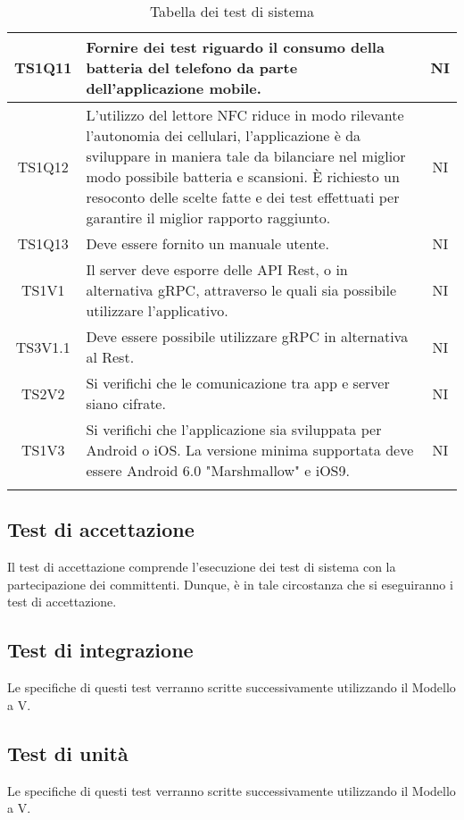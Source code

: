 \begin{center}
\begin{longtable}{|c|p{10cm}|c|}
			\hline
			TS1Q11 & Fornire dei test riguardo il consumo della batteria del telefono da parte dell'applicazione mobile. & NI \\	
			\hline
			TS1Q12 & L’utilizzo del lettore NFC riduce in modo rilevante l’autonomia dei cellulari, l’applicazione è da sviluppare in maniera tale da bilanciare nel miglior modo possibile batteria e scansioni. È richiesto un resoconto delle scelte fatte e dei test effettuati per garantire il miglior rapporto raggiunto. & NI \\	
			\hline
			TS1Q13 & Deve essere fornito un manuale utente. & NI \\	
			\hline
			TS1V1 & Il server deve esporre delle API Rest, o in alternativa gRPC, attraverso le quali sia possibile utilizzare l'applicativo. & NI \\	
			\hline
			TS3V1.1 & Deve essere possibile utilizzare gRPC in alternativa al Rest. & NI \\	
			\hline
			TS2V2 & Si verifichi che le comunicazione tra app e server siano cifrate. & NI \\	
			\hline
			TS1V3 & Si verifichi che l'applicazione sia sviluppata per Android o iOS. La versione minima supportata deve essere  Android 6.0 "Marshmallow" e iOS9. & NI \\	
			\hline
			\hiderowcolors
			\caption{Tabella dei test di sistema}		
		\end{longtable}	
	\end{center}

	\subsection{Test di accettazione}
	Il test di accettazione comprende l'esecuzione dei test di sistema con la partecipazione dei committenti. Dunque, è in tale circostanza che si eseguiranno i test di accettazione. 
	\subsection{Test di integrazione}
	Le specifiche di questi test verranno scritte successivamente utilizzando il Modello a V.
	\subsection{Test di unità}
	Le specifiche di questi test verranno scritte successivamente utilizzando il Modello a V.
